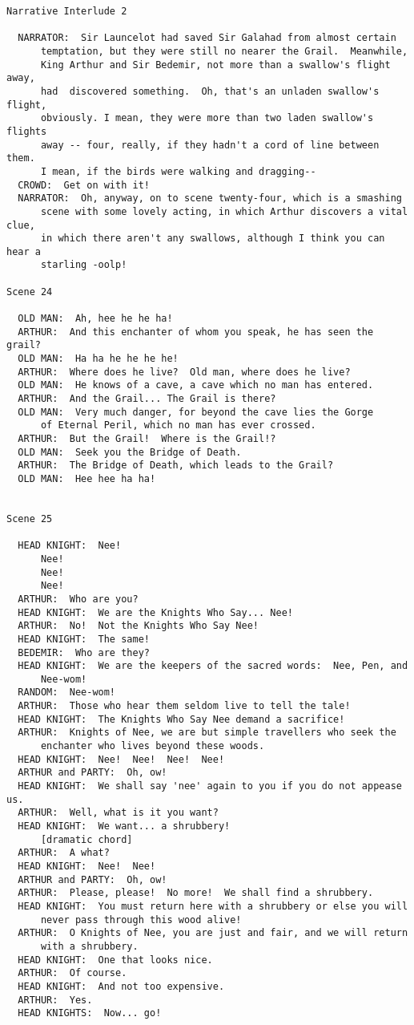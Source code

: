 \documentclass{article}
\begin{document}
\begin{verbatim}
Narrative Interlude 2

  NARRATOR:  Sir Launcelot had saved Sir Galahad from almost certain
      temptation, but they were still no nearer the Grail.  Meanwhile,
      King Arthur and Sir Bedemir, not more than a swallow's flight away,
      had  discovered something.  Oh, that's an unladen swallow's flight,
      obviously. I mean, they were more than two laden swallow's flights
      away -- four, really, if they hadn't a cord of line between them.
      I mean, if the birds were walking and dragging--
  CROWD:  Get on with it!
  NARRATOR:  Oh, anyway, on to scene twenty-four, which is a smashing
      scene with some lovely acting, in which Arthur discovers a vital clue,
      in which there aren't any swallows, although I think you can hear a
      starling -oolp!

Scene 24

  OLD MAN:  Ah, hee he he ha!
  ARTHUR:  And this enchanter of whom you speak, he has seen the grail?
  OLD MAN:  Ha ha he he he he!
  ARTHUR:  Where does he live?  Old man, where does he live?
  OLD MAN:  He knows of a cave, a cave which no man has entered.
  ARTHUR:  And the Grail... The Grail is there?
  OLD MAN:  Very much danger, for beyond the cave lies the Gorge
      of Eternal Peril, which no man has ever crossed.
  ARTHUR:  But the Grail!  Where is the Grail!?
  OLD MAN:  Seek you the Bridge of Death.
  ARTHUR:  The Bridge of Death, which leads to the Grail?
  OLD MAN:  Hee hee ha ha!


Scene 25

  HEAD KNIGHT:  Nee!
      Nee!
      Nee!
      Nee!
  ARTHUR:  Who are you?
  HEAD KNIGHT:  We are the Knights Who Say... Nee!
  ARTHUR:  No!  Not the Knights Who Say Nee!
  HEAD KNIGHT:  The same!
  BEDEMIR:  Who are they?
  HEAD KNIGHT:  We are the keepers of the sacred words:  Nee, Pen, and
      Nee-wom!
  RANDOM:  Nee-wom!
  ARTHUR:  Those who hear them seldom live to tell the tale!
  HEAD KNIGHT:  The Knights Who Say Nee demand a sacrifice!
  ARTHUR:  Knights of Nee, we are but simple travellers who seek the
      enchanter who lives beyond these woods.
  HEAD KNIGHT:  Nee!  Nee!  Nee!  Nee!
  ARTHUR and PARTY:  Oh, ow!
  HEAD KNIGHT:  We shall say 'nee' again to you if you do not appease us.
  ARTHUR:  Well, what is it you want?
  HEAD KNIGHT:  We want... a shrubbery!
      [dramatic chord]
  ARTHUR:  A what?
  HEAD KNIGHT:  Nee!  Nee!
  ARTHUR and PARTY:  Oh, ow!
  ARTHUR:  Please, please!  No more!  We shall find a shrubbery.
  HEAD KNIGHT:  You must return here with a shrubbery or else you will
      never pass through this wood alive!
  ARTHUR:  O Knights of Nee, you are just and fair, and we will return
      with a shrubbery.
  HEAD KNIGHT:  One that looks nice.
  ARTHUR:  Of course.
  HEAD KNIGHT:  And not too expensive.
  ARTHUR:  Yes.
  HEAD KNIGHTS:  Now... go!


\end{verbatim}
\end{document}
